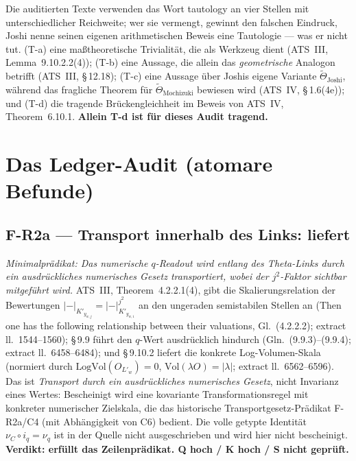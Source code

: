 \documentclass[11pt,a4paper]{article}
\begin{document}
Die auditierten Texte verwenden das Wort \glqq tautology\grqq{} an vier Stellen mit
unterschiedlicher Reichweite; wer sie vermengt, gewinnt den falschen Eindruck,
Joshi nenne seinen eigenen arithmetischen Beweis eine Tautologie --- was er
nicht tut. (T-a) eine maßtheoretische Trivialität, die als Werkzeug dient
(ATS~III, Lemma~9.10.2.2(4)); (T-b) eine Aussage, die allein das
\emph{geometrische} Analogon betrifft (ATS~III, \S\,12.18); (T-c) eine Aussage
über Joshis eigene Variante $\tilde\Theta_{\mathrm{Joshi}}$, während das
fragliche Theorem für $\tilde\Theta_{\mathrm{Mochizuki}}$ bewiesen wird
(ATS~IV, \S\,1.6(4e)); und (T-d) die tragende Brückengleichheit im Beweis von
ATS~IV, Theorem~6.10.1.
\textbf{Allein T-d ist für dieses Audit tragend.}

\section{Das Ledger-Audit (atomare Befunde)}\label{sec:ledger}

\subsection{F-R2a --- Transport innerhalb des Links: liefert}\label{sec:r2a}

\emph{Minimalprädikat: Das numerische $q$-Readout wird entlang des Theta-Links
durch ein ausdrückliches numerisches Gesetz transportiert, wobei der
$j^2$-Faktor sichtbar mitgeführt wird.} ATS~III, Theorem~4.2.2.1(4), gibt die
Skalierungsrelation der Bewertungen
$|-|_{K'_{y_{w,j}}} = |-|^{j^2}_{K'_{y_{w,1}}}$ an den ungeraden semistabilen
Stellen an (\glqq Then one has the following relationship between their
valuations\grqq{}, Gl.~(4.2.2.2); extract ll.~1544--1560); \S\,9.9 führt den
$q$-Wert ausdrücklich hindurch (Gln.~(9.9.3)--(9.9.4); extract
ll.~6458--6484); und \S\,9.10.2 liefert die konkrete Log-Volumen-Skala (normiert
durch $\mathrm{LogVol}(O_{L'_w}) = 0$, $\mathrm{Vol}(\lambda O) = |\lambda|$;
extract ll.~6562--6596). Das ist \emph{Transport durch ein ausdrückliches
numerisches Gesetz}, nicht Invarianz eines Wertes: Bescheinigt wird eine
kovariante Transformationsregel mit konkreter numerischer Zielskala, die das historische Transportgesetz-Prädikat F-R2a/C4 (mit Abhängigkeit von C6) bedient. Die volle getypte Identität
$\nu_C \circ i_q = \nu_q$ ist in der Quelle nicht ausgeschrieben und wird hier
nicht bescheinigt.
\textbf{Verdikt: erfüllt das Zeilenprädikat. Q hoch / K hoch / S nicht
geprüft.}
\end{document}
